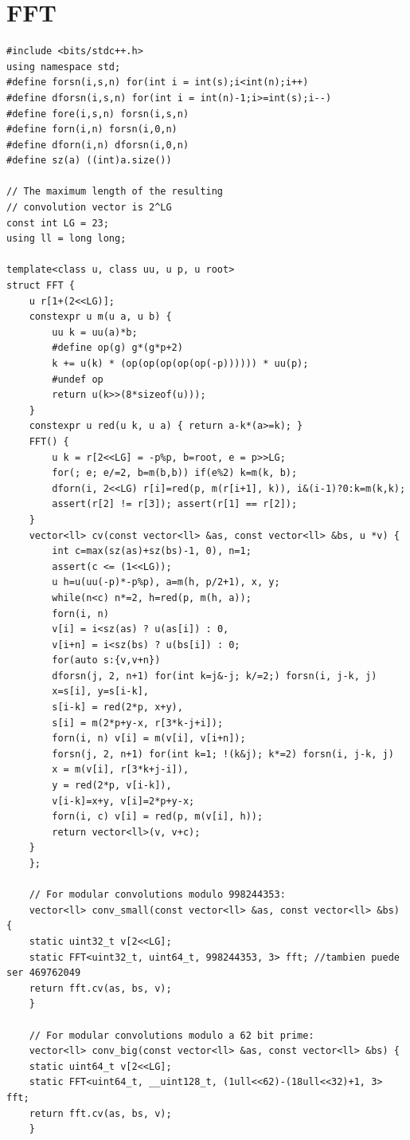 \documentclass{article}
\begin{document}
\section{FFT}
\begin{lstlisting}
#include <bits/stdc++.h>
using namespace std;
#define forsn(i,s,n) for(int i = int(s);i<int(n);i++)
#define dforsn(i,s,n) for(int i = int(n)-1;i>=int(s);i--)
#define fore(i,s,n) forsn(i,s,n)
#define forn(i,n) forsn(i,0,n)
#define dforn(i,n) dforsn(i,0,n)
#define sz(a) ((int)a.size())

// The maximum length of the resulting
// convolution vector is 2^LG
const int LG = 23;
using ll = long long;

template<class u, class uu, u p, u root>
struct FFT {
    u r[1+(2<<LG)];
    constexpr u m(u a, u b) {
        uu k = uu(a)*b;
        #define op(g) g*(g*p+2)
        k += u(k) * (op(op(op(op(op(-p)))))) * uu(p);
        #undef op
        return u(k>>(8*sizeof(u)));
    }
    constexpr u red(u k, u a) { return a-k*(a>=k); }
    FFT() {
        u k = r[2<<LG] = -p%p, b=root, e = p>>LG;
        for(; e; e/=2, b=m(b,b)) if(e%2) k=m(k, b);
        dforn(i, 2<<LG) r[i]=red(p, m(r[i+1], k)), i&(i-1)?0:k=m(k,k);
        assert(r[2] != r[3]); assert(r[1] == r[2]);
    }
    vector<ll> cv(const vector<ll> &as, const vector<ll> &bs, u *v) {
        int c=max(sz(as)+sz(bs)-1, 0), n=1;
        assert(c <= (1<<LG));
        u h=u(uu(-p)*-p%p), a=m(h, p/2+1), x, y;
        while(n<c) n*=2, h=red(p, m(h, a));
        forn(i, n)
        v[i] = i<sz(as) ? u(as[i]) : 0,
        v[i+n] = i<sz(bs) ? u(bs[i]) : 0;
        for(auto s:{v,v+n})
        dforsn(j, 2, n+1) for(int k=j&-j; k/=2;) forsn(i, j-k, j)
        x=s[i], y=s[i-k],
        s[i-k] = red(2*p, x+y),
        s[i] = m(2*p+y-x, r[3*k-j+i]);
        forn(i, n) v[i] = m(v[i], v[i+n]);
        forsn(j, 2, n+1) for(int k=1; !(k&j); k*=2) forsn(i, j-k, j)
        x = m(v[i], r[3*k+j-i]),
        y = red(2*p, v[i-k]),
        v[i-k]=x+y, v[i]=2*p+y-x;
        forn(i, c) v[i] = red(p, m(v[i], h));
        return vector<ll>(v, v+c);
    }
    };

    // For modular convolutions modulo 998244353:
    vector<ll> conv_small(const vector<ll> &as, const vector<ll> &bs) {
    static uint32_t v[2<<LG];
    static FFT<uint32_t, uint64_t, 998244353, 3> fft; //tambien puede ser 469762049
    return fft.cv(as, bs, v);
    }

    // For modular convolutions modulo a 62 bit prime:
    vector<ll> conv_big(const vector<ll> &as, const vector<ll> &bs) {
    static uint64_t v[2<<LG];
    static FFT<uint64_t, __uint128_t, (1ull<<62)-(18ull<<32)+1, 3> fft;
    return fft.cv(as, bs, v);
    }


\end{lstlisting}
\end{document}
